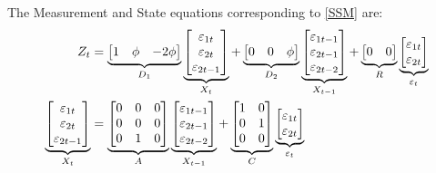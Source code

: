 \documentclass[a4paper,12pt]{article}
\newcommand{\bsq}{\begin{subequations}}\newcommand{\esq}{\end{subequations}}
\begin{document}
The Measurement and State equations corresponding to \ref{SSM} are:\bsq\label%
{K0SSM}%
\begin{align}
Z_{t}& =\underbrace{%
\begin{bmatrix}
1 & \phi  & -2\phi 
\end{bmatrix}%
}_{D_{1}}\underbrace{%
\begin{bmatrix}
\varepsilon _{1t} \\ 
\varepsilon _{2t} \\ 
\varepsilon _{2t-1}%
\end{bmatrix}%
}_{X_{t}}+\underbrace{%
\begin{bmatrix}
0 & 0 & \phi 
\end{bmatrix}%
}_{D_{2}}\underbrace{%
\begin{bmatrix}
\varepsilon _{1t-1} \\ 
\varepsilon _{2t-1} \\ 
\varepsilon _{2t-2}%
\end{bmatrix}%
}_{X_{t-1}}+\underbrace{%
\begin{bmatrix}
0 & 0%
\end{bmatrix}%
}_{R}\underbrace{%
\begin{bmatrix}
\varepsilon _{1t} \\ 
\varepsilon _{2t}%
\end{bmatrix}%
}_{\varepsilon _{t}} \\
\underbrace{%
\begin{bmatrix}
\varepsilon _{1t} \\ 
\varepsilon _{2t} \\ 
\varepsilon _{2t-1}%
\end{bmatrix}%
}_{X_{t}}& =\underbrace{%
\begin{bmatrix}
0 & 0 & 0 \\ 
0 & 0 & 0 \\ 
0 & 1 & 0%
\end{bmatrix}%
}_{A}\underbrace{%
\begin{bmatrix}
\varepsilon _{1t-1} \\ 
\varepsilon _{2t-1} \\ 
\varepsilon _{2t-2}%
\end{bmatrix}%
}_{X_{t-1}}+\underbrace{%
\begin{bmatrix}
1 & 0 \\ 
0 & 1 \\ 
0 & 0%
\end{bmatrix}%
}_{C}\underbrace{%
\begin{bmatrix}
\varepsilon _{1t} \\ 
\varepsilon _{2t}%
\end{bmatrix}%
}_{\varepsilon _{t}}
\end{align}%
\esq$\allowbreak $
\end{document}
